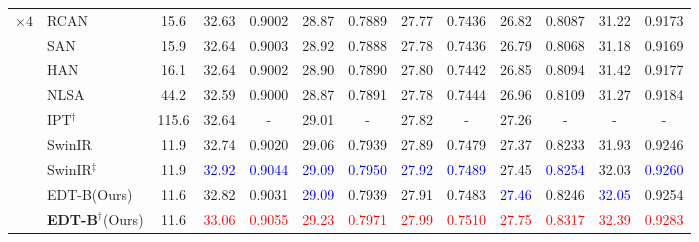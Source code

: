 \documentclass[runningheads]{llncs}
\begin{document}
\begin{table}[t]
\begin{center}
{\begin{tabular}{| c | l | c | c | c | c | c | c | c | c | c | c | c |}
					\multirow{9}{*}{$\times 4$} & RCAN~\cite{zhang2018image} & 15.6 & 32.63 & 0.9002 & 28.87 & 0.7889 & 27.77 & 0.7436 & 26.82 & 0.8087 & 31.22 & 0.9173 \\
					~ & SAN~\cite{dai2019second} & 15.9 & 32.64 & 0.9003 & 28.92 & 0.7888 & 27.78 & 0.7436 & 26.79 & 0.8068 & 31.18 & 0.9169 \\
~ & HAN~\cite{niu2020single} & 16.1 & 32.64 & 0.9002 & 28.90 & 0.7890 & 27.80 & 0.7442 & 26.85 & 0.8094 & 31.42 & 0.9177 \\
					~ & NLSA~\cite{mei2021image} & 44.2 & 32.59 & 0.9000 & 28.87 & 0.7891 & 27.78 & 0.7444 & 26.96 & 0.8109 & 31.27 & 0.9184 \\
~ & IPT$^\dagger$~\cite{chen2021pre} & 115.6 & 32.64 & - & 29.01 & - & 27.82 & - & 27.26 & - & - & - \\
					~ & SwinIR~\cite{liang2021swinir} & 11.9 & 32.74 & 0.9020 & 29.06 & 0.7939 & 27.89 & 0.7479 & 27.37 & 0.8233 & 31.93 & 0.9246 \\
					~ & SwinIR{$^\ddagger$}~\cite{liang2021swinir} & 11.9 & \textcolor{blue}{32.92} & \textcolor{blue}{0.9044} & \textcolor{blue}{29.09} & \textcolor{blue}{0.7950} & \textcolor{blue}{27.92} & \textcolor{blue}{0.7489} & 27.45 & \textcolor{blue}{0.8254} & 32.03 & \textcolor{blue}{0.9260} \\
					~ & EDT-B(Ours) & 11.6 & 32.82 & 0.9031 & \textcolor{blue}{29.09} & 0.7939 & 27.91 & 0.7483 & \textcolor{blue}{27.46} & 0.8246 & \textcolor{blue}{32.05} & 0.9254 \\
					~ & \textbf{EDT-B}$^\dagger$(Ours) & 11.6 & \textcolor{red}{33.06} & \textcolor{red}{0.9055} & \textcolor{red}{29.23} & \textcolor{red}{0.7971} & \textcolor{red}{27.99} & \textcolor{red}{0.7510} & \textcolor{red}{27.75} & \textcolor{red}{0.8317} & \textcolor{red}{32.39} & \textcolor{red}{0.9283} \\
					\hline
				\end{tabular}
			}
		\end{center}
		\vspace{-0.2in}
		\label{tab:classical_sr}
	\end{table}
	
\end{document}

